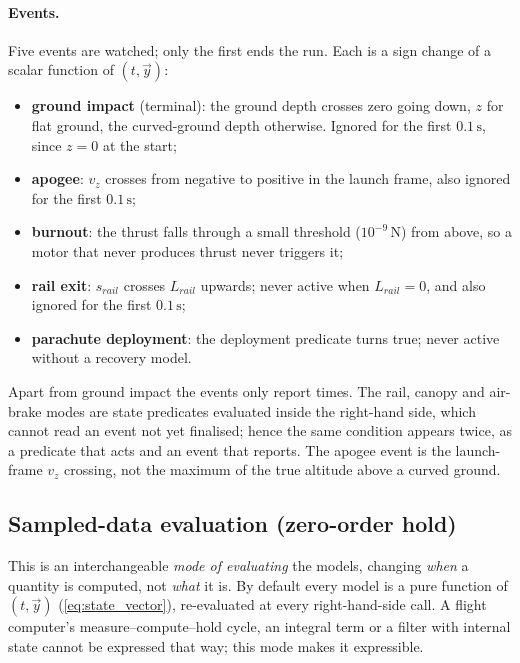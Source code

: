 \paragraph{Events.} Five events are watched; only the first ends the run. Each is a sign change of
a scalar function of $(t,\vec{y})$:
\begin{itemize}
    \item \textbf{ground impact} (terminal): the ground depth crosses zero going down, $z$ for flat
    ground, the curved-ground depth otherwise. Ignored for the first $0.1\,\mathrm{s}$, since
    $z=0$ at the start;
    \item \textbf{apogee}: $v_z$ crosses from negative to positive in the launch frame, also
    ignored for the first $0.1\,\mathrm{s}$;
    \item \textbf{burnout}: the thrust falls through a small threshold ($10^{-9}$\,N) from above,
    so a motor that never produces thrust never triggers it;
    \item \textbf{rail exit}: $s_{rail}$ crosses $L_{rail}$ upwards; never active when
    $L_{rail}=0$, and also ignored for the first $0.1\,\mathrm{s}$;
    \item \textbf{parachute deployment}: the deployment predicate turns true; never active without
    a recovery model.
\end{itemize}
Apart from ground impact the events only report times. The rail, canopy and air-brake modes are
state predicates evaluated inside the right-hand side, which cannot read an event not yet
finalised; hence the same condition appears twice, as a predicate that acts and an event that
reports.
The apogee event is the launch-frame $v_z$ crossing, not the maximum of the true altitude above a
curved ground.


\subsection{Sampled-data evaluation (zero-order hold)}\label{sec:sampled}
This is an interchangeable \emph{mode of evaluating} the models, changing \emph{when} a quantity is
computed, not \emph{what} it is. By default every model is a pure function of $(t,\vec{y})$
(\autoref{eq:state_vector}), re-evaluated at every right-hand-side call. A flight computer's
measure--compute--hold cycle, an integral term or a filter with internal state cannot be expressed
that way; this mode makes it expressible.

